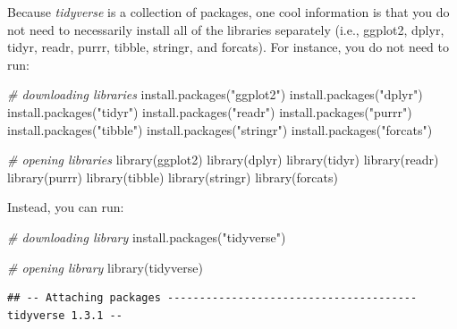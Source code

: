 \documentclass[
]{book}
\newenvironment{Shaded}{\begin{snugshade}}{\end{snugshade}}
\newcommand{\CommentTok}[1]{\textcolor[rgb]{0.56,0.35,0.01}{\textit{#1}}}
\newcommand{\FunctionTok}[1]{\textcolor[rgb]{0.00,0.00,0.00}{#1}}
\newcommand{\NormalTok}[1]{#1}
\newcommand{\StringTok}[1]{\textcolor[rgb]{0.31,0.60,0.02}{#1}}
\begin{document}
Because \emph{tidyverse} is a collection of packages, one cool information is that you do not need to necessarily install all of the libraries separately (i.e., ggplot2, dplyr, tidyr, readr, purrr, tibble, stringr, and forcats). For instance, you do not need to run:

\begin{Shaded}
\begin{Highlighting}[]
\CommentTok{\# downloading libraries}
\FunctionTok{install.packages}\NormalTok{(}\StringTok{"ggplot2"}\NormalTok{)}
\FunctionTok{install.packages}\NormalTok{(}\StringTok{"dplyr"}\NormalTok{)}
\FunctionTok{install.packages}\NormalTok{(}\StringTok{"tidyr"}\NormalTok{)}
\FunctionTok{install.packages}\NormalTok{(}\StringTok{"readr"}\NormalTok{)}
\FunctionTok{install.packages}\NormalTok{(}\StringTok{"purrr"}\NormalTok{)}
\FunctionTok{install.packages}\NormalTok{(}\StringTok{"tibble"}\NormalTok{)}
\FunctionTok{install.packages}\NormalTok{(}\StringTok{"stringr"}\NormalTok{)}
\FunctionTok{install.packages}\NormalTok{(}\StringTok{"forcats"}\NormalTok{)}

\CommentTok{\# opening libraries}
\FunctionTok{library}\NormalTok{(ggplot2)}
\FunctionTok{library}\NormalTok{(dplyr)}
\FunctionTok{library}\NormalTok{(tidyr)}
\FunctionTok{library}\NormalTok{(readr)}
\FunctionTok{library}\NormalTok{(purrr)}
\FunctionTok{library}\NormalTok{(tibble)}
\FunctionTok{library}\NormalTok{(stringr)}
\FunctionTok{library}\NormalTok{(forcats)}
\end{Highlighting}
\end{Shaded}

Instead, you can run:

\begin{Shaded}
\begin{Highlighting}[]
\CommentTok{\# downloading library}
\FunctionTok{install.packages}\NormalTok{(}\StringTok{"tidyverse"}\NormalTok{)}
\end{Highlighting}
\end{Shaded}

\begin{Shaded}
\begin{Highlighting}[]
\CommentTok{\# opening library}
\FunctionTok{library}\NormalTok{(tidyverse)}
\end{Highlighting}
\end{Shaded}

\begin{verbatim}
## -- Attaching packages --------------------------------------- tidyverse 1.3.1 --
\end{verbatim}
\end{document}
